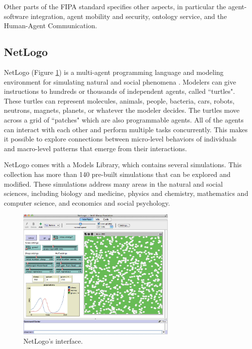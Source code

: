 Other  parts  of  the  \ac{FIPA}  standard  specifies  other  aspects,  in  particular  the  agent-software
integration, agent mobility and security, ontology service, and the Human-Agent Communication.

\subsection{NetLogo}

\noindent NetLogo (Figure \ref{fig:netlogo}) is a multi-agent programming language and modeling environment for simulating natural and social phenomena \cite{tisue:netlogo}.
Modelers can give instructions to hundreds or thousands of independent agents, called ``turtles".
These turtles can represent molecules, animals, people, bacteria, cars, robots, neutrons, magnets, planets, or whatever the modeler decides.
The turtles move across a grid of ``patches" which are also programmable agents.
All of the agents can interact with each other and perform multiple tasks concurrently.
This makes it possible to explore connections between micro-level behaviors of individuals and macro-level patterns that emerge from their interactions.

NetLogo comes with a Models Library, which contains several simulations.
This collection has more than 140 pre-built simulations that can be explored and modified.
These simulations address many areas in the natural and social sciences, including biology and medicine, physics and chemistry, mathematics and computer science, and economics and social psychology.

\begin{figure}
  \centering
  \includegraphics[width=0.7\textwidth]{./Images/netlogo5}
  \caption{NetLogo's interface.}
  \label{fig:netlogo}
\end{figure}

